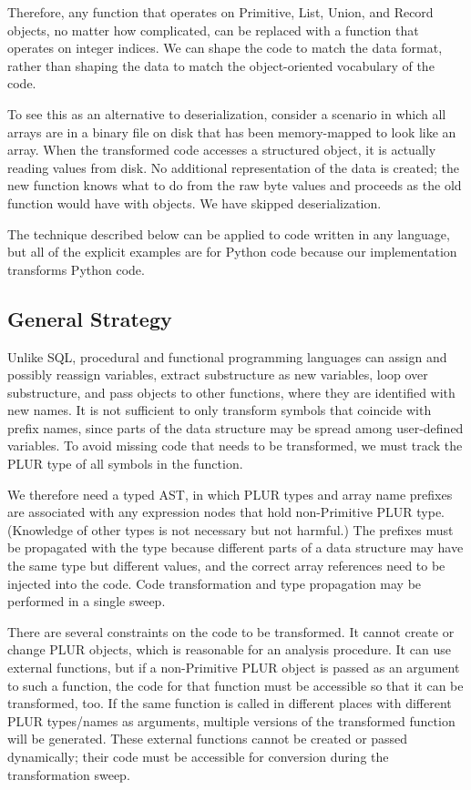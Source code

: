\documentclass[10pt, conference, compsocconf]{IEEEtran}
\begin{document}
Therefore, any function that operates on Primitive, List, Union, and Record objects, no matter how complicated, can be replaced with a function that operates on integer indices. We can shape the code to match the data format, rather than shaping the data to match the object-oriented vocabulary of the code.

To see this as an alternative to deserialization, consider a scenario in which all arrays are in a binary file on disk that has been memory-mapped to look like an array. When the transformed code accesses a structured object, it is actually reading values from disk. No additional representation of the data is created; the new function knows what to do from the raw byte values and proceeds as the old function would have with objects. We have skipped deserialization.

The technique described below can be applied to code written in any language, but all of the explicit examples are for Python code because our implementation\cite{plur} transforms Python code.

\subsection{General Strategy}

Unlike SQL, procedural and functional programming languages can assign and possibly reassign variables, extract substructure as new variables, loop over substructure, and pass objects to other functions, where they are identified with new names. It is not sufficient to only transform symbols that coincide with prefix names, since parts of the data structure may be spread among user-defined variables. To avoid missing code that needs to be transformed, we must track the PLUR type of all symbols in the function.

We therefore need a typed AST, in which PLUR types and array name prefixes are associated with any expression nodes that hold non-Primitive PLUR type. (Knowledge of other types is not necessary but not harmful.) The prefixes must be propagated with the type because different parts of a data structure may have the same type but different values, and the correct array references need to be injected into the code. Code transformation and type propagation may be performed in a single sweep.

There are several constraints on the code to be transformed. It cannot create or change PLUR objects, which is reasonable for an analysis procedure. It can use external functions, but if a non-Primitive PLUR object is passed as an argument to such a function, the code for that function must be accessible so that it can be transformed, too. If the same function is called in different places with different PLUR types/names as arguments, multiple versions of the transformed function will be generated. These external functions cannot be created or passed dynamically; their code must be accessible for conversion during the transformation sweep.
\end{document}
